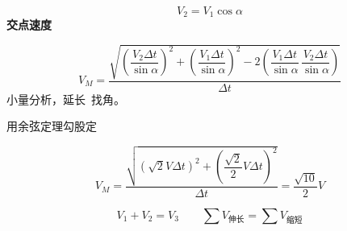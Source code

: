 \noindent {}
\[
V_2=V_1\cos\alpha
\]
\textbf{交点速度}%

\[
V_M=\frac{\sqrt{\left(\dfrac{V_2\Delta t}{\sin\alpha}\right)^{2}+\left(\dfrac{V_1\Delta t}{\sin\alpha}\right)^{2}-2\left(\dfrac{V_1\Delta t}{\sin\alpha}\,\dfrac{V_2\Delta t}{\sin\alpha}\right)}}{\Delta t}
\]%
小量分析，延长\ 找角。


\noindent 用余弦定理\quad 勾股定%

\[
V_M=\frac{\sqrt{\left(\sqrt2V\Delta t\right)^{2}+\left(\dfrac{\sqrt2}{2}V\Delta t\right)^{2}}}{\Delta t}=\frac{\sqrt{10}}{2}V
\]%
\begin{keybox}[伸缩等速]%
\[
V_1+V_2=V_3\qquad \sum V_{\text{伸长}}=\sum V_{\text{缩短}}
\]
\end{keybox}

